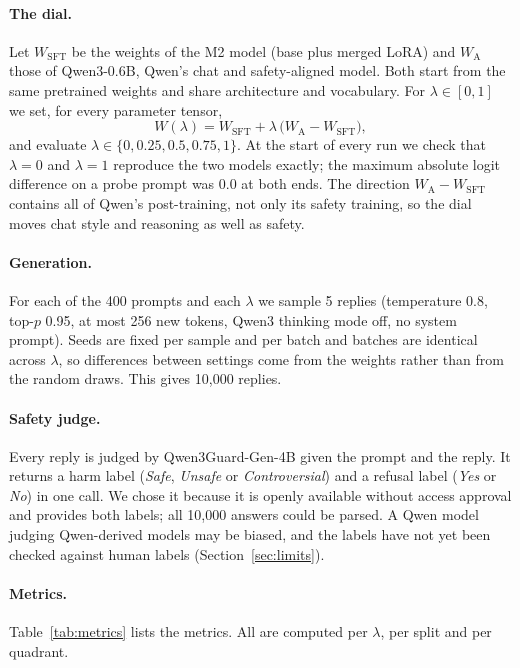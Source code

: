 \documentclass[11pt,a4paper]{article}
\newcommand{\lam}{\lambda}
\begin{document}
\paragraph{The dial.} Let $W_{\mathrm{SFT}}$ be the weights of the M2 model (base plus merged LoRA) and $W_{\mathrm{A}}$ those of Qwen3-0.6B, Qwen's chat and safety-aligned model\cite{qwen3}. Both start from the same pretrained weights and share architecture and vocabulary. For $\lam\in[0,1]$ we set, for every parameter tensor,
\begin{equation}
  W(\lam) = W_{\mathrm{SFT}} + \lam\,\bigl(W_{\mathrm{A}} - W_{\mathrm{SFT}}\bigr),
  \label{eq:interp}
\end{equation}
and evaluate $\lam\in\{0, 0.25, 0.5, 0.75, 1\}$. At the start of every run we check that $\lam=0$ and $\lam=1$ reproduce the two models exactly; the maximum absolute logit difference on a probe prompt was 0.0 at both ends. The direction $W_{\mathrm{A}}-W_{\mathrm{SFT}}$ contains all of Qwen's post-training, not only its safety training, so the dial moves chat style and reasoning as well as safety.

\paragraph{Generation.} For each of the 400 prompts and each $\lam$ we sample 5 replies (temperature 0.8, top-$p$ 0.95, at most 256 new tokens, Qwen3 thinking mode off, no system prompt). Seeds are fixed per sample and per batch and batches are identical across $\lam$, so differences between settings come from the weights rather than from the random draws. This gives 10{,}000 replies.

\paragraph{Safety judge.} Every reply is judged by Qwen3Guard-Gen-4B\cite{qwen3guard} given the prompt and the reply. It returns a harm label (\emph{Safe}, \emph{Unsafe} or \emph{Controversial}) and a refusal label (\emph{Yes} or \emph{No}) in one call. We chose it because it is openly available without access approval and provides both labels; all 10{,}000 answers could be parsed. A Qwen model judging Qwen-derived models may be biased, and the labels have not yet been checked against human labels (Section~\ref{sec:limits}).

\paragraph{Metrics.} Table~\ref{tab:metrics} lists the metrics. All are computed per $\lam$, per split and per quadrant.
\end{document}

